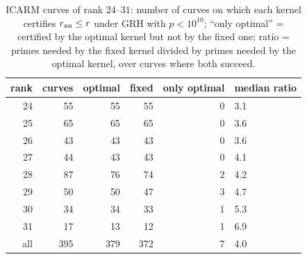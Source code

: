 \begin{table}[!ht]
\centering\small
\begin{tabular}{rrrrrl}
\toprule
rank & curves & optimal & fixed & only optimal & median ratio\\
\midrule
24 & 55 & 55 & 55 & 0 & 3.1\\
25 & 65 & 65 & 65 & 0 & 3.6\\
26 & 43 & 43 & 43 & 0 & 3.6\\
27 & 44 & 43 & 43 & 0 & 4.1\\
28 & 87 & 76 & 74 & 2 & 4.2\\
29 & 50 & 50 & 47 & 3 & 4.7\\
30 & 34 & 34 & 33 & 1 & 5.3\\
31 & 17 & 13 & 12 & 1 & 6.9\\
\midrule
all & 395 & 379 & 372 & 7 & 4.0\\
\bottomrule
\end{tabular}
\caption{ICARM curves of rank $24$--$31$: number of curves on which each kernel certifies $r_{\mathrm{an}}\le r$ under GRH with $p<10^{10}$; ``only optimal'' = certified by the optimal kernel but not by the fixed one; ratio = primes needed by the fixed kernel divided by primes needed by the optimal kernel, over curves where both succeed.}
\label{tab:board}
\end{table}
